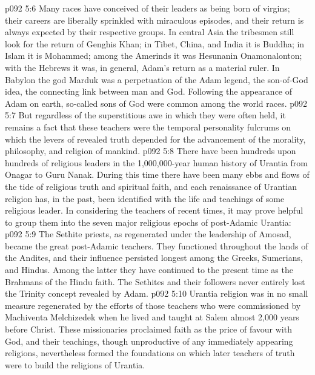 \vs p092 5:6 Many races have conceived of their leaders as being born of virgins; their careers are liberally sprinkled with miraculous episodes, and their return is always expected by their respective groups. In central Asia the tribesmen still look for the return of Genghis Khan; in Tibet, China, and India it is Buddha; in Islam it is Mohammed; among the Amerinds it was Hesunanin Onamonalonton; with the Hebrews it was, in general, Adam’s return as a material ruler. In Babylon the god Marduk was a perpetuation of the Adam legend, the son\hyp{}of\hyp{}God idea, the connecting link between man and God. Following the appearance of Adam on earth, so\hyp{}called sons of God were common among the world races.
\vs p092 5:7 But regardless of the superstitious awe in which they were often held, it remains a fact that these teachers were the temporal personality fulcrums on which the levers of revealed truth depended for the advancement of the morality, philosophy, and religion of mankind.
\vs p092 5:8 There have been hundreds upon hundreds of religious leaders in the 1,000,000\hyp{}year human history of Urantia from Onagar to Guru Nanak. During this time there have been many ebbs and flows of the tide of religious truth and spiritual faith, and each renaissance of Urantian religion has, in the past, been identified with the life and teachings of some religious leader. In considering the teachers of recent times, it may prove helpful to group them into the seven major religious epochs of post\hyp{}Adamic Urantia:
\vs p092 5:9 \bibnobreakspace {} The Sethite priests, as regenerated under the leadership of Amosad, became the great post\hyp{}Adamic teachers. They functioned throughout the lands of the Andites, and their influence persisted longest among the Greeks, Sumerians, and Hindus. Among the latter they have continued to the present time as the Brahmans of the Hindu faith. The Sethites and their followers never entirely lost the Trinity concept revealed by Adam.
\vs p092 5:10 \bibnobreakspace {} Urantia religion was in no small measure regenerated by the efforts of those teachers who were commissioned by Machiventa Melchizedek when he lived and taught at Salem almost 2,000 years before Christ. These missionaries proclaimed faith as the price of favour with God, and their teachings, though unproductive of any immediately appearing religions, nevertheless formed the foundations on which later teachers of truth were to build the religions of Urantia.
